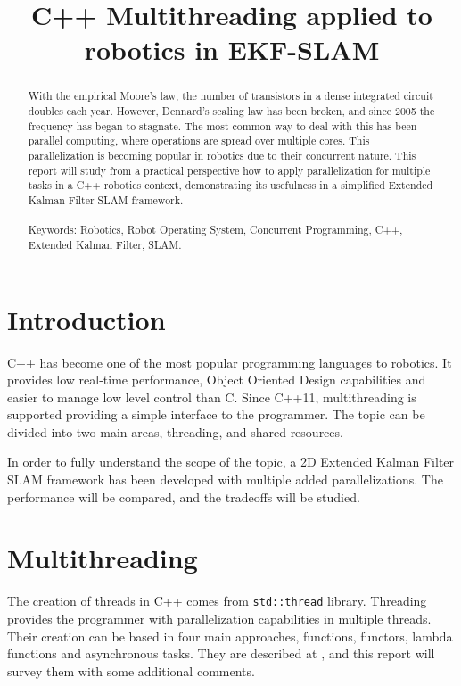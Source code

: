 \documentclass[conference]{IEEEtran}
\title{C++ Multithreading applied to robotics in EKF-SLAM}
\author{
\IEEEauthorblockN{Daniel Casado Herraez}
\IEEEauthorblockA{dcasadoherraez@keio.jp}
}
\begin{document}
\maketitle
\thispagestyle{empty}
\pagestyle{empty}


\begin{abstract}

With the empirical Moore's law, the number of transistors in a dense integrated circuit doubles each year. However, Dennard's scaling law has been broken, and since 2005 the frequency has began to stagnate. The most common way to deal with this has been parallel computing, where operations are spread over multiple cores. This parallelization is becoming popular in robotics due to their concurrent nature. This report will study from a practical perspective how to apply parallelization for multiple tasks in a C++ robotics context, demonstrating its usefulness in a simplified Extended Kalman Filter SLAM framework.\\
\\
Keywords: Robotics, Robot Operating System, Concurrent Programming, C++, Extended Kalman Filter, SLAM.

\end{abstract}



\section{Introduction}
C++ has become one of the most popular programming languages to robotics. It provides low real-time performance, Object Oriented Design capabilities and easier to manage low level control than C. Since C++11, multithreading is supported providing a simple interface to the programmer. The topic can be divided into two main areas, threading, and shared resources.

In order to fully understand the scope of the topic, a 2D Extended Kalman Filter SLAM framework has been developed with multiple added parallelizations. The performance will be compared, and the tradeoffs will be studied.

\section{Multithreading} 

The creation of threads in C++ comes from \verb|std::thread| library. Threading provides the programmer with parallelization capabilities in multiple threads. Their creation can be based in four main approaches, functions, functors, lambda functions and asynchronous tasks. They are described at \cite{Mult}, and this report will survey them with some additional comments.
\end{document}
